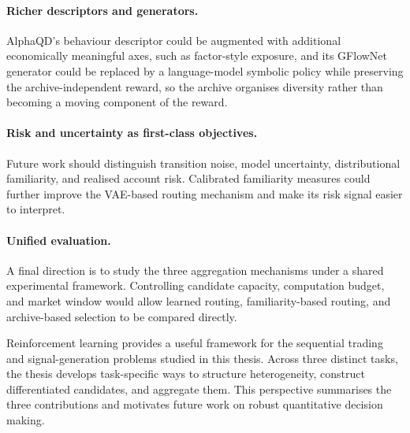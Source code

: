 \paragraph{Richer descriptors and generators.} AlphaQD's behaviour descriptor could be augmented with additional economically meaningful axes, such as factor-style exposure, and its GFlowNet generator could be replaced by a language-model symbolic policy while preserving the archive-independent reward, so the archive organises diversity rather than becoming a moving component of the reward.

\paragraph{Risk and uncertainty as first-class objectives.} Future work should distinguish transition noise, model uncertainty, distributional familiarity, and realised account risk. Calibrated familiarity measures could further improve the VAE-based routing mechanism and make its risk signal easier to interpret.

\paragraph{Unified evaluation.} A final direction is to study the three aggregation mechanisms under a shared experimental framework. Controlling candidate capacity, computation budget, and market window would allow learned routing, familiarity-based routing, and archive-based selection to be compared directly.

\bigskip
\noindent Reinforcement learning provides a useful framework for the sequential trading and signal-generation problems studied in this thesis. Across three distinct tasks, the thesis develops task-specific ways to structure heterogeneity, construct differentiated candidates, and aggregate them. This perspective summarises the three contributions and motivates future work on robust quantitative decision making.

